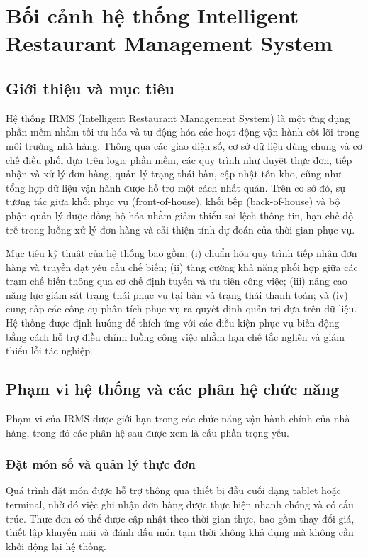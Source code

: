 \section{Bối cảnh hệ thống Intelligent Restaurant Management System}
 
\subsection{Giới thiệu và mục tiêu}
 
Hệ thống IRMS (Intelligent Restaurant Management System) là một ứng dụng phần mềm nhằm tối ưu hóa và tự động hóa các hoạt động vận hành cốt lõi trong môi trường nhà hàng. Thông qua các giao diện số, cơ sở dữ liệu dùng chung và cơ chế điều phối dựa trên logic phần mềm, các quy trình như duyệt thực đơn, tiếp nhận và xử lý đơn hàng, quản lý trạng thái bàn, cập nhật tồn kho, cũng như tổng hợp dữ liệu vận hành được hỗ trợ một cách nhất quán. Trên cơ sở đó, sự tương tác giữa khối phục vụ (front-of-house), khối bếp (back-of-house) và bộ phận quản lý được đồng bộ hóa nhằm giảm thiểu sai lệch thông tin, hạn chế độ trễ trong luồng xử lý đơn hàng và cải thiện tính dự đoán của thời gian phục vụ.
 
Mục tiêu kỹ thuật của hệ thống bao gồm: (i) chuẩn hóa quy trình tiếp nhận đơn hàng và truyền đạt yêu cầu chế biến; (ii) tăng cường khả năng phối hợp giữa các trạm chế biến thông qua cơ chế định tuyến và ưu tiên công việc; (iii) nâng cao năng lực giám sát trạng thái phục vụ tại bàn và trạng thái thanh toán; và (iv) cung cấp các công cụ phân tích phục vụ ra quyết định quản trị dựa trên dữ liệu. Hệ thống được định hướng để thích ứng với các điều kiện phục vụ biến động bằng cách hỗ trợ điều chỉnh luồng công việc nhằm hạn chế tắc nghẽn và giảm thiểu lỗi tác nghiệp.
 
\subsection{Phạm vi hệ thống và các phân hệ chức năng}

Phạm vi của IRMS được giới hạn trong các chức năng vận hành chính của nhà hàng, trong đó các phân hệ sau được xem là cấu phần trọng yếu.

\subsubsection{Đặt món số và quản lý thực đơn}

Quá trình đặt món được hỗ trợ thông qua thiết bị đầu cuối dạng tablet hoặc terminal, nhờ đó việc ghi nhận đơn hàng được thực hiện nhanh chóng và có cấu trúc. Thực đơn có thể được cập nhật theo thời gian thực, bao gồm thay đổi giá, thiết lập khuyến mãi và đánh dấu món tạm thời không khả dụng mà không cần khởi động lại hệ thống.

